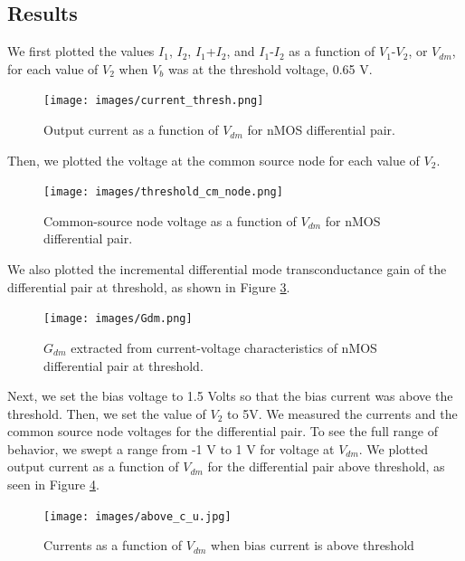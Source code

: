 \documentclass{article}
\begin{document}
\subsection{Results}
We first plotted the values $I_1$, $I_2$, $I_1$+$I_2$, and $I_1$-$I_2$ as a function of $V_1$-$V_2$, or $V_{dm}$, for each value of $V_2$ when $V_b$ was at the threshold voltage, 0.65 V.
\begin{figure}[H]
  \begin{center}       
  \texttt{[image: images/current\_thresh.png]}
  \caption{Output current as a function of $V_{dm}$ for nMOS differential pair.}   
  \label{fig:exp1_below_current}
  \end{center}
\end{figure}
Then, we plotted the voltage at the common source node for each value of $V_2$. 
\begin{figure}[H]
  \begin{center}       
  \texttt{[image: images/threshold\_cm\_node.png]}
  \caption{Common-source node voltage as a function of $V_{dm}$ for nMOS differential pair.}   
  \label{fig:exp1_below_voltage}
  \end{center}
\end{figure}
We also plotted the incremental differential mode transconductance gain of the differential pair at threshold, as shown in Figure \ref{fig: Gdm}.
\begin{figure}[H]
  \begin{center}       
  \texttt{[image: images/Gdm.png]}
  \caption{$G_{dm}$ extracted from current-voltage characteristics of nMOS differential pair at threshold.}   
  \label{fig:exp1_below_voltage}
  \label{fig: Gdm}
  \end{center}
\end{figure}

Next, we set the bias voltage to 1.5 Volts so that the bias current was above the threshold. Then, we set the value of $ V_{2}$ to 5V. We measured the currents and the common source node voltages for the differential pair. To see the full range of behavior, we swept a range from -1 V to 1 V for voltage at $V_{dm}$. We plotted output current as a function of $V_{dm}$ for the differential pair above threshold, as seen in Figure \ref{fig:above_v}.

\begin{figure}[H]
  \begin{center}       
  \texttt{[image: images/above\_c\_u.jpg]}
  \caption{Currents as a function of $ V_{dm}$ when bias current is above threshold}   
  \label{fig:above_v}
  \end{center}
\end{figure}
\end{document}
